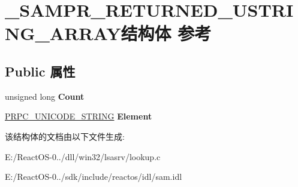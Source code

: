 \hypertarget{struct___s_a_m_p_r___r_e_t_u_r_n_e_d___u_s_t_r_i_n_g___a_r_r_a_y}{}\section{\+\_\+\+S\+A\+M\+P\+R\+\_\+\+R\+E\+T\+U\+R\+N\+E\+D\+\_\+\+U\+S\+T\+R\+I\+N\+G\+\_\+\+A\+R\+R\+A\+Y结构体 参考}
\label{struct___s_a_m_p_r___r_e_t_u_r_n_e_d___u_s_t_r_i_n_g___a_r_r_a_y}
\subsection*{Public 属性}
\begin{DoxyCompactItemize}
\item 
\mbox{\label{struct___s_a_m_p_r___r_e_t_u_r_n_e_d___u_s_t_r_i_n_g___a_r_r_a_y_a7982e32f90657a09d05f0fb45ff7cc63}} 
unsigned long {\bfseries Count}
\item 
\mbox{\label{struct___s_a_m_p_r___r_e_t_u_r_n_e_d___u_s_t_r_i_n_g___a_r_r_a_y_a586ff1e5b91e0dfbf35e9d462f31458f}} 
\hyperlink{struct___r_p_c___u_n_i_c_o_d_e___s_t_r_i_n_g}{P\+R\+P\+C\+\_\+\+U\+N\+I\+C\+O\+D\+E\+\_\+\+S\+T\+R\+I\+NG} {\bfseries Element}
\end{DoxyCompactItemize}


该结构体的文档由以下文件生成\+:\begin{DoxyCompactItemize}
\item 
E\+:/\+React\+O\+S-\/0../dll/win32/lsasrv/lookup.\+c\item 
E\+:/\+React\+O\+S-\/0../sdk/include/reactos/idl/sam.\+idl\end{DoxyCompactItemize}
